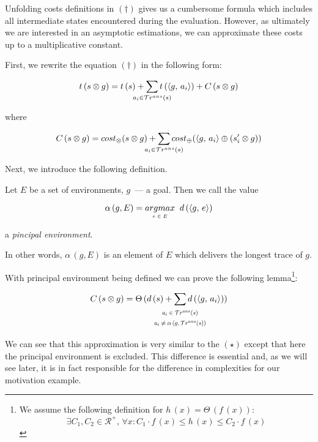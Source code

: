 Unfolding costs definitions in $(\dagger)$ gives us a cumbersome formula which 
includes all intermediate states encountered during the evaluation. However, as ultimately
we are interested in an asymptotic estimations, we can approximate these costs up to a multiplicative constant.

First, we rewrite the equation $(\dagger)$ in the following form:

\[ t\,(s \otimes g)  =  t\,(s) + \smashoperator[lr]{\sum\limits_{a_i \in \tra{s}}} t\,(\taskst{g}{a_i}) + C\,(s \otimes g) \]

where

\[ C\,(s \otimes g) = \costconj{s}{g} + \smashoperator[lr]{\sum\limits_{a_i \in \tra{s}}} \costdisj{\taskst{g}{a_i}}{(s'_i \otimes g)} \]

Next, we introduce the following definition.

\begin{definition}
Let $E$ be a set of environments, $g$~--- a goal. Then we call the value

\[
\alpha\,(g, E) = \argmax{e \in E} d\,(\taskst{g}{e})
\]

a \emph{pincipal environment}.
\end{definition}

In other words, $\alpha\,(g, E)$ is an element of $E$ which delivers the longest trace of $g$.

With principal environment being defined we can prove the following lemma\footnote{We assume the following definition for 
$h\,(x) = \Theta\,(f\,(x))$: \[\exists C_1, C_2 \in \mathcal{R^{+}}, \, \forall x : C_1 \cdot f\,(x) \le h\,(x) \le C_2 \cdot f\,(x) \]}:

\begin{lemma}

\[
C\,(s \otimes g) =
\Theta\,(d\,(s) + \smashoperator[lr]{\sum\limits_{\begin{array}{c}
                                                                                   \scalebox{0.7}{$a_i \in \tra{s}$} \\
                                                                                   \scalebox{0.7}{$a_i \ne \alpha\,(g, \tra{s}) $} \\
                                                                              \end{array}}} d\,(\taskst{g}{a_i}))	
\]
\end{lemma}

We can see that this approximation is very similar to the $(\star)$ except that here the principal environment is excluded. This difference
is essential and, as we will see later, it is in fact responsible for the difference in complexities for our motivation example.

